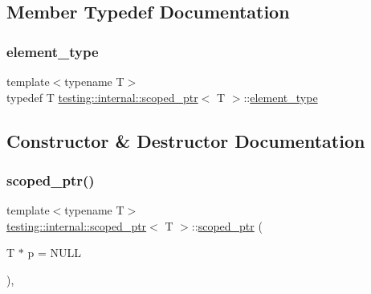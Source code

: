 \subsection{Member Typedef Documentation}
\mbox{\label{classtesting_1_1internal_1_1scoped__ptr_ae755ffeebada8e20b68c1d1ffa91cf13}} 
\subsubsection{\texorpdfstring{element\_type}{element\_type}}
{\footnotesize\ttfamily template$<$typename T$>$ \\
typedef T \mbox{\hyperlink{classtesting_1_1internal_1_1scoped__ptr}{testing\+::internal\+::scoped\+\_\+ptr}}$<$ T $>$\+::\mbox{\hyperlink{classtesting_1_1internal_1_1scoped__ptr_ae755ffeebada8e20b68c1d1ffa91cf13}{element\+\_\+type}}}



\subsection{Constructor \& Destructor Documentation}
\mbox{\label{classtesting_1_1internal_1_1scoped__ptr_adb972432999a0c63720df148964ac2a5}} 
\subsubsection{\texorpdfstring{scoped\_ptr()}{scoped\_ptr()}}
{\footnotesize\ttfamily template$<$typename T$>$ \\
\mbox{\hyperlink{classtesting_1_1internal_1_1scoped__ptr}{testing\+::internal\+::scoped\+\_\+ptr}}$<$ T $>$\+::\mbox{\hyperlink{classtesting_1_1internal_1_1scoped__ptr}{scoped\+\_\+ptr}} (\begin{DoxyParamCaption}\item[{T $\ast$}]{p = {\ttfamily NULL} }\end{DoxyParamCaption})\hspace{0.3cm}{\ttfamily [inline]}, {\ttfamily [explicit]}}


